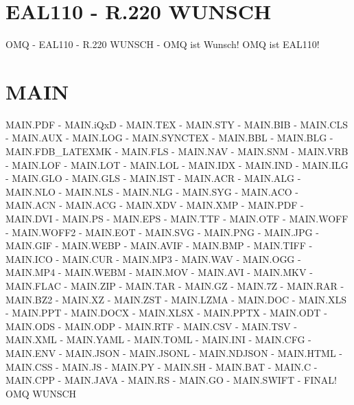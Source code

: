 \documentclass{MAIN}
\begin{document}
\maketitle
\section*{EAL110 - R.220 WUNSCH}
OMQ - EAL110 - R.220 WUNSCH - OMQ ist Wunsch! OMQ ist EAL110!
\section*{MAIN}
MAIN.PDF - MAIN.iQxD - MAIN.TEX - MAIN.STY - MAIN.BIB - MAIN.CLS - MAIN.AUX - MAIN.LOG - MAIN.SYNCTEX - MAIN.BBL - MAIN.BLG - MAIN.FDB_LATEXMK - MAIN.FLS - MAIN.NAV - MAIN.SNM - MAIN.VRB - MAIN.LOF - MAIN.LOT - MAIN.LOL - MAIN.IDX - MAIN.IND - MAIN.ILG - MAIN.GLO - MAIN.GLS - MAIN.IST - MAIN.ACR - MAIN.ALG - MAIN.NLO - MAIN.NLS - MAIN.NLG - MAIN.SYG - MAIN.ACO - MAIN.ACN - MAIN.ACG - MAIN.XDV - MAIN.XMP - MAIN.PDF - MAIN.DVI - MAIN.PS - MAIN.EPS - MAIN.TTF - MAIN.OTF - MAIN.WOFF - MAIN.WOFF2 - MAIN.EOT - MAIN.SVG - MAIN.PNG - MAIN.JPG - MAIN.GIF - MAIN.WEBP - MAIN.AVIF - MAIN.BMP - MAIN.TIFF - MAIN.ICO - MAIN.CUR - MAIN.MP3 - MAIN.WAV - MAIN.OGG - MAIN.MP4 - MAIN.WEBM - MAIN.MOV - MAIN.AVI - MAIN.MKV - MAIN.FLAC - MAIN.ZIP - MAIN.TAR - MAIN.GZ - MAIN.7Z - MAIN.RAR - MAIN.BZ2 - MAIN.XZ - MAIN.ZST - MAIN.LZMA - MAIN.DOC - MAIN.XLS - MAIN.PPT - MAIN.DOCX - MAIN.XLSX - MAIN.PPTX - MAIN.ODT - MAIN.ODS - MAIN.ODP - MAIN.RTF - MAIN.CSV - MAIN.TSV - MAIN.XML - MAIN.YAML - MAIN.TOML - MAIN.INI - MAIN.CFG - MAIN.ENV - MAIN.JSON - MAIN.JSONL - MAIN.NDJSON - MAIN.HTML - MAIN.CSS - MAIN.JS - MAIN.PY - MAIN.SH - MAIN.BAT - MAIN.C - MAIN.CPP - MAIN.JAVA - MAIN.RS - MAIN.GO - MAIN.SWIFT - FINAL!
\cite{omq_eal110}
\ac{OMQ}
\ac{WUNSCH}

\printindex
\printglossary
\printnomenclature
\printacronyms
\end{document}
